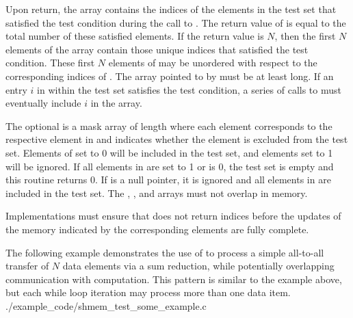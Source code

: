 \begin{apidefinition}
{    Upon return, the  array contains the indices of the elements
    in the test set that satisfied the test condition during the call to
    .  The return value of  is
    equal to the total number of these satisfied elements.  If the return value
    is $N$, then the first $N$ elements of the  array contain
    those unique indices that satisfied the test condition.
    These first $N$ elements of  may be unordered with respect to
    the corresponding indices of .
    The array pointed
    to by  must be at least  long.
    If an entry $i$ in  within the test set satisfies the test
    condition, a series of calls to  must eventually
    include $i$ in the  array.

    The optional  is a mask array of length  where each element
    corresponds to the respective element in  and indicates whether
    the element is excluded from the test set.  Elements of  set to
    0 will be included in the test set, and elements set to 1 will be ignored.  If all
    elements in  are set to 1 or  is 0, the test set is
    empty and this routine returns 0.  If  is a null pointer, it is ignored and all
    elements in  are included in the test set.  The ,
    , and  arrays must not overlap in memory.

    Implementations must ensure that  does not return
    indices before the updates of the memory indicated by the corresponding
     elements are fully complete.
}


\begin{apiexamples}
  \apicexample
      {The following \Cstd[11] example demonstrates the use of
       to process a simple all-to-all transfer of $N$
      data elements via a sum reduction, while potentially overlapping
      communication with computation.  This pattern is similar to the
       example above, but each while loop iteration may
      process more than one data item.}
      {./example_code/shmem_test_some_example.c}
      {}
\end{apiexamples}

\end{apidefinition}
